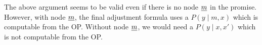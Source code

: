 The above argument seems to
be valid even if there is no node $\rvm$ in the promise.
However, with node $\rvm$,
the final adjustment
formula uses a $P(y\mid m, x)$
which is computable from the OP.
Without node $\rvm$,
we would need a $P(y\mid x, x')$
which is not computable from the
OP.


%
%
%
%

